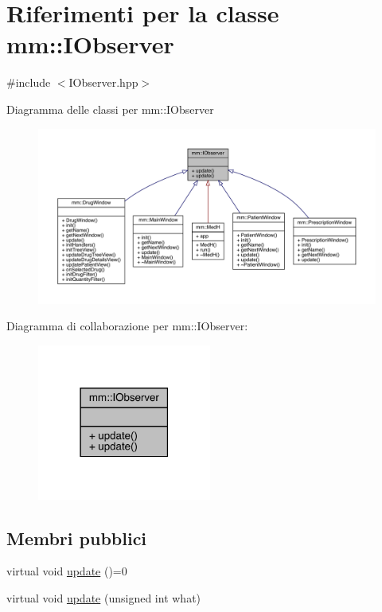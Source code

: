 \hypertarget{classmm_1_1_i_observer}{}\section{Riferimenti per la classe mm\+:\+:I\+Observer}
\label{classmm_1_1_i_observer}


{\ttfamily \#include $<$I\+Observer.\+hpp$>$}



Diagramma delle classi per mm\+:\+:I\+Observer
\nopagebreak
\begin{figure}[H]
\begin{center}
\leavevmode
\includegraphics[width=350pt]{d4/dd5/classmm_1_1_i_observer__inherit__graph}
\end{center}
\end{figure}


Diagramma di collaborazione per mm\+:\+:I\+Observer\+:
\nopagebreak
\begin{figure}[H]
\begin{center}
\leavevmode
\includegraphics[width=162pt]{d7/d84/classmm_1_1_i_observer__coll__graph}
\end{center}
\end{figure}
\subsection*{Membri pubblici}
\begin{DoxyCompactItemize}
\item 
virtual void \mbox{\hyperlink{classmm_1_1_i_observer_a6422af04f8e9f3ba9d6d412a3bcdd03e}{update}} ()=0
\item 
virtual void \mbox{\hyperlink{classmm_1_1_i_observer_add1245a281c47575cc0e42449635a9fd}{update}} (unsigned int what)
\end{DoxyCompactItemize}


